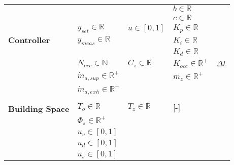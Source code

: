 \begin{table}[h!]
{\begin{tabular}{l|l|l|l|l}
                                          &                 &                  &       $b \in \mathbb{R}$           &                    \\
                                          &                 &                  &       $c \in \mathbb{R}$           &                    \\ \midrule
\multirow{3}{*}{\textbf{Controller}}               &      $y_{set} \in \mathbb{R}$  &        $u \in [0,1]$       &      $K_p \in \mathbb{R}$          &                    \\ 
                                          &      $y_{meas} \in \mathbb{R}$        &                  &      $K_i \in \mathbb{R}$          &                    \\ 
                                          &                 &                  &      $K_d \in \mathbb{R}$          &                    \\ \midrule
\multirow{9}{*}{\textbf{Building Space}}           & $N_{occ} \in \mathbb{N}$       &        $C_z \in \mathbb{R}$     &      $K_{occ} \in \mathbb{R}^+$     &        $\Delta t$  \\ 
                                          &$\dot{m}_{a,sup} \in \mathbb{R}^+$&                  &      $m_z \in \mathbb{R}^+$          &                   \\ 
                                          &$\dot{m}_{a,exh} \in \mathbb{R}^+$&                  &                     &                    \\ 
                                          &                 &                  &                     &                    \\ 
                                          &     $T_o \in \mathbb{R}$       &      $T_z \in \mathbb{R}$       &         [-]         &                    \\ 
                                          &     $\Phi_s \in \mathbb{R}^+$    &                  &                          &                    \\ 
                                          &     $u_v \in [0,1]$       &                  &                          &                    \\ 
                                          &     $u_d \in [0,1]$       &                  &                          &                    \\ 
                                          &     $u_{s} \in [0,1]$    &                  &                          &                    \\ 
\bottomrule
\end{tabular}

}
\end{table}


